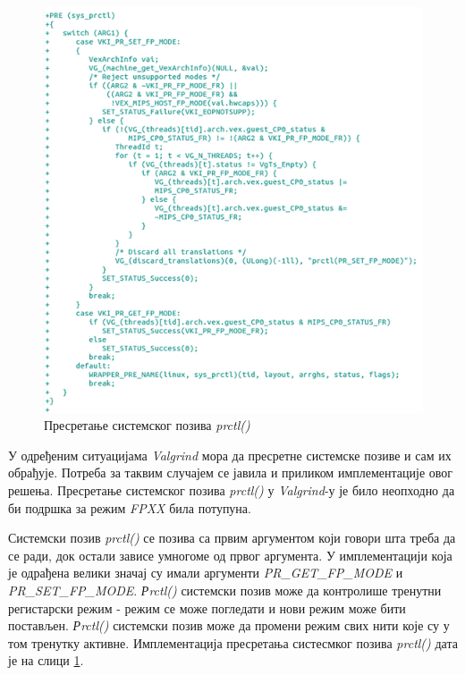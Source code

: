\documentclass[12pt,oneside]{memoir}
\begin{document}
\begin{figure}[h!]
\begin{center}
\includegraphics[scale=0.75]{slika28.png}
\end{center}
\caption{Пресретање системског позива \textit{prctl()}}
\label{fig:prctl}
\end{figure}

\indent У одређеним ситуацијама \textit{Valgrind} мора да пресретне системске позиве и сам их обрађује. Потреба за таквим случајем се јавила и приликом имплементације овог решења. Пресретање системског позива \textit{prctl()} у \textit{Valgrind}-у је било неопходно да би подршка за режим \textit{FPXX} била потупуна.

\indent Системски позив \textit{prctl()} се позива са првим аргументом који говори шта треба да се ради, док остали зависе умногоме од првог аргумента. У имплементацији која је одрађена велики значај су имали аргументи \textit{PR\_GET\_FP\_MODE} и \textit{PR\_SET\_FP\_MODE}. \textit{Рrctl()} системски позив може да контролише тренутни регистарски режим - режим се може погледати и нови режим може бити постављен. \textit{Рrctl()} системски позив може да промени режим свих нити које су у том тренутку активне. Имплементација пресретања систесмког позива \textit{prctl()} дата је на слици \ref{fig:prctl}.
\end{document}
